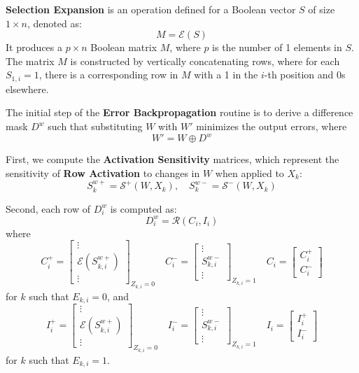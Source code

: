 \documentclass[pmlr]{jmlr}
\begin{document}
\begin{definition}
    \textbf{Selection Expansion} is an operation defined for a Boolean vector \( S \) of size \( 1 \times n \), denoted as:
    \[ M = \mathcal{E}(S) \]
    It produces a \( p \times n \) Boolean matrix \( M \), where \( p \) is the number of 1 elements in \( S \). The matrix \( M \) is constructed by vertically concatenating rows, where for each \( S_{1,i} = 1 \), there is a corresponding row in \( M \) with a 1 in the \( i \)-th position and 0s elsewhere.
\end{definition}

The initial step of the \textbf{Error Backpropagation} routine is to derive a difference mask \( D^w \) such that substituting \( W \) with \( W' \) minimizes the output errors, where
\[ W' = W \oplus D^w \]

First, we compute the \textbf{Activation Sensitivity} matrices, which represent the sensitivity of \textbf{Row Activation} to changes in \( W \) when applied to \( X_k \):
\[ S^{w+}_k = \mathcal{S^+}(W, X_k), \quad S^{w-}_k = \mathcal{S^-}(W, X_k) \]

Second, each row of \( D^w_i \) is computed as:
\[ D^w_i = \mathcal{R}(C_i, I_i) \]
where
\[
    C^+_i = \begin{bmatrix} \vdots \\ \mathcal{E}(S^{w+}_{k,i}) \\ \vdots \end{bmatrix}_{Z_{k,i} = 0} \quad
    C^-_i = \begin{bmatrix} \vdots \\ S^{w-}_{k,i} \\ \vdots \end{bmatrix}_{Z_{k,i} = 1} \quad
    C_i = \begin{bmatrix} C^+_i \\ C^-_i \end{bmatrix}
\]
for \( k \) such that \( E_{k,i} = 0 \), and
\[
    I^+_i = \begin{bmatrix} \vdots \\ \mathcal{E}(S^{w+}_{k,i}) \\ \vdots \end{bmatrix}_{Z_{k,i} = 0} \quad
    I^-_i = \begin{bmatrix} \vdots \\ S^{w-}_{k,i} \\ \vdots \end{bmatrix}_{Z_{k,i} = 1} \quad
    I_i = \begin{bmatrix} I^+_i \\ I^-_i \end{bmatrix}
\]
for \( k \) such that \( E_{k,i} = 1 \).
\end{document}
